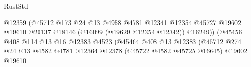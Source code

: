 \begin{lexlean}{RustStd}
\begin{coremodule}
                                                            @12359
                                                            (@45712
                                                              @173
                                                              @24
                                                              @13
                                                              @4958
                                                              @4781
                                                              @12341
                                                              @12354
                                                              @45727
                                                              @19602
                                                              @19610
                                                              @20137
                                                              @18146
                                                              (@16099 (@19629 @12354 @12342))
                                                              @16249))
                                                          (@45456
                                                            @408
                                                            @114
                                                            @13
                                                            @16
                                                            @12383
                                                            @4523
                                                            (@45464
                                                              @408
                                                              @13
                                                              @12383
                                                              (@45712
                                                                @274
                                                                @24
                                                                @13
                                                                @4582
                                                                @4781
                                                                @12364
                                                                @12378
                                                                (@45722 @4582 @45725 @16645)
                                                                @19602
                                                                @19610

\end{coremodule}
\end{lexlean}
